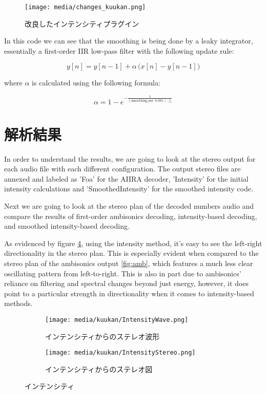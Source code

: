 \documentclass[a4paper, 12pt]{article}
\begin{document}
\begin{figure}
    \centering
    \texttt{[image: media/changes\_kuukan.png]}
    \caption{改良したインテンシティプラグイン}
    \label{fig:newCode}
\end{figure}

In this code we can see that the smoothing is being done by a leaky integrator, essentially a first-order IIR low-pass filter with the following update rule:

\[y[n]=y[n-1]+\alpha\,\big(x[n]-y[n-1]\big)\]

where $\alpha$ is calculated using the following formula:

\[\alpha=1-e^{-\frac{1}{(\text{smoothing\_ms}\cdot0.001)\cdot f_s}}\]

\section{解析結果}

In order to understand the results, we are going to look at the stereo output for each audio file with each different configuration. The output stereo files are annexed and labeled as 'Foa' for the AIIRA decoder, 'Intensity' for the initial intensity calculations and 'SmoothedIntensity' for the smoothed intensity code.

Next we are going to look at the stereo plan of the decoded numbers audio and compare the results of first-order ambisonics decoding, intensity-based decoding, and smoothed intensity-based decoding.

As evidenced by figure \ref{fig:intensity}, using the intensity method, it's easy to see the left-right directionality in the stereo plan. This is especially evident when compared to the stereo plan of the ambisonics output \ref{fig:amb}, which features a much less clear oscillating pattern from left-to-right. This is also in part due to ambisonics' reliance on filtering and spectral changes beyond just energy, however, it does point to a particular strength in directionality when it comes to intensity-based methods.

\begin{figure}[h!]
\centering
\begin{subfigure}{1.0\textwidth}
  \centering
  \texttt{[image: media/kuukan/IntensityWave.png]}
  \caption{インテンシティからのステレオ波形}
  \label{fig:intWave}
\end{subfigure}
\vspace{5mm}
\begin{subfigure}{1.0\textwidth}
  \centering
  \texttt{[image: media/kuukan/IntensityStereo.png]}
  \caption{インテンシティからのステレオ図}
  \label{fig:intSte}
\end{subfigure}
\caption{インテンシティ}
\label{fig:intensity}
\end{figure}
\end{document}
